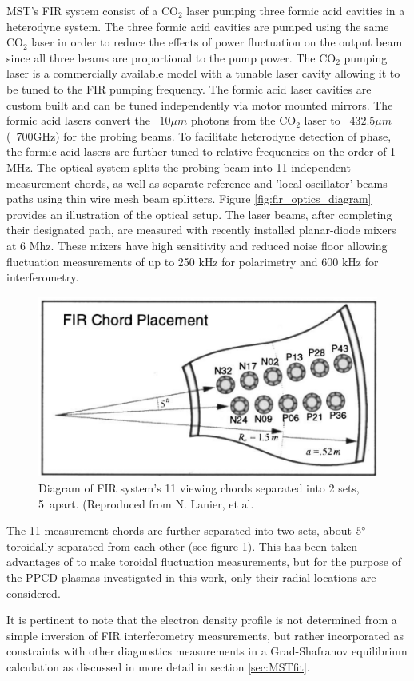 MST's FIR system consist of a CO$_2$ laser pumping three formic acid cavities in a heterodyne system. The three formic acid cavities are pumped using the same CO$_2$ laser in order to reduce the effects of power fluctuation on the output beam since all three beams are proportional to the pump power. The CO$_2$ pumping laser is a commercially available model with a tunable laser cavity allowing it to be tuned to the FIR pumping frequency. The formic acid laser cavities are custom built and can be tuned independently via motor mounted mirrors. The formic acid lasers convert the ~$10\mu m$ photons from the CO$_2$ laser to ~$432.5\mu m$ (~700GHz) for the probing beams. To facilitate heterodyne detection of phase, the formic acid lasers are further tuned to relative frequencies on the order of 1 MHz. The optical system splits the probing beam into 11 independent measurement chords, as well as separate reference and 'local oscillator' beams paths using thin wire mesh beam splitters. Figure \ref{fig:fir_optics_diagram} provides an illustration of the optical setup. The laser beams, after completing their designated path, are measured with recently installed planar-diode mixers at 6 Mhz. These mixers have high sensitivity and reduced noise floor allowing fluctuation measurements of up to 250 kHz for polarimetry and 600 kHz for interferometry\cite{Parke2016}. 
\begin{figure}[!htb]
	\centering
	\includegraphics[width = 0.75\linewidth]{./implementation/fir_chords.PNG}

	\caption[Diagram of FIR chord offset]{Diagram of FIR system's 11 viewing chords separated into 2 sets, 5\textdegree\ apart. (Reproduced from N. Lanier, et al.\cite{Lanier2001}}	
	\label{fig:fir_chords}
\end{figure}

The 11 measurement chords are further separated into two sets, about $5\degree$ toroidally separated from each other (see figure \ref{fig:fir_chords}). This has been taken advantages of to make toroidal fluctuation measurements, but for the purpose of the PPCD plasmas investigated in this work, only their radial locations are considered. 

It is pertinent to note that the electron density profile is not determined from a simple inversion of FIR interferometry measurements, but rather incorporated as constraints with other diagnostics measurements in a Grad-Shafranov equilibrium calculation \cite{Anderson2001} as discussed in more detail in section \ref{sec:MSTfit}.